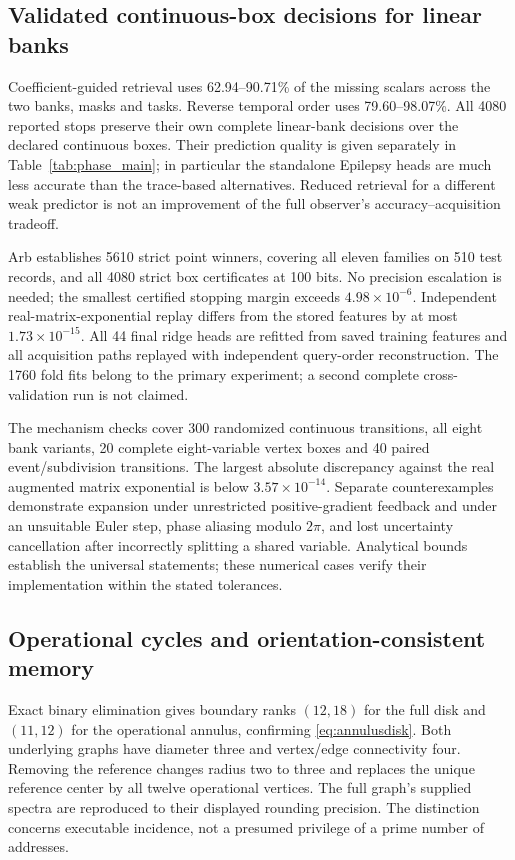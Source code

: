 \documentclass[11pt,a4paper]{article}
\theoremstyle{definition}\newtheorem{definition}[theorem]{Definition}
\begin{document}
\subsection{Validated continuous-box decisions for linear banks}

Coefficient-guided retrieval uses 62.94--90.71\% of the missing scalars across the two banks, masks and tasks. Reverse temporal order uses 79.60--98.07\%. All 4080 reported stops preserve their own complete linear-bank decisions over the declared continuous boxes. Their prediction quality is given separately in Table~\ref{tab:phase_main}; in particular the standalone Epilepsy heads are much less accurate than the trace-based alternatives. Reduced retrieval for a different weak predictor is not an improvement of the full observer's accuracy--acquisition tradeoff.

Arb establishes 5610 strict point winners, covering all eleven families on 510 test records, and all 4080 strict box certificates at 100 bits. No precision escalation is needed; the smallest certified stopping margin exceeds $4.98\times10^{-6}$. Independent real-matrix-exponential replay differs from the stored features by at most $1.73\times10^{-15}$. All 44 final ridge heads are refitted from saved training features and all acquisition paths replayed with independent query-order reconstruction. The 1760 fold fits belong to the primary experiment; a second complete cross-validation run is not claimed.

The mechanism checks cover 300 randomized continuous transitions, all eight bank variants, 20 complete eight-variable vertex boxes and 40 paired event/subdivision transitions. The largest absolute discrepancy against the real augmented matrix exponential is below $3.57\times10^{-14}$. Separate counterexamples demonstrate expansion under unrestricted positive-gradient feedback and under an unsuitable Euler step, phase aliasing modulo $2\pi$, and lost uncertainty cancellation after incorrectly splitting a shared variable. Analytical bounds establish the universal statements; these numerical cases verify their implementation within the stated tolerances.

\subsection{Operational cycles and orientation-consistent memory}\label{sec:orientationresults}
Exact binary elimination gives boundary ranks $(12,18)$ for the full disk and $(11,12)$ for the operational annulus, confirming \eqref{eq:annulusdisk}. Both underlying graphs have diameter three and vertex/edge connectivity four. Removing the reference changes radius two to three and replaces the unique reference center by all twelve operational vertices. The full graph's supplied spectra are reproduced to their displayed rounding precision. The distinction concerns executable incidence, not a presumed privilege of a prime number of addresses.
\end{document}
